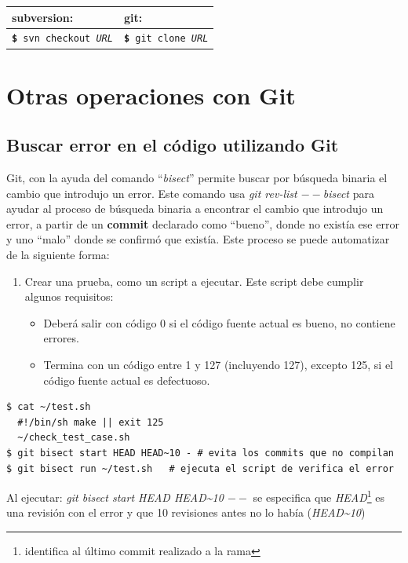 \documentclass[12pt, spanish, oneside, onecolumn, a4paper]{report}
\newcommand{\svngit}[2]{%
  \begin{tabular}{| l | l |} 
    \hline subversion: & git: \\
    \hline 
    \colorbox{mygray}{\texttt{\textbf{\footnotesize\$} #1}} & \colorbox{mygray}{ \texttt{\textbf{\footnotesize\$} #2}} 
  \end{tabular}
}
\begin{document}
% 
\svngit{svn checkout \emph{URL}}{git clone \emph{URL}} 
\chapter{Otras operaciones con Git} 
\label{chap:othergit} 
\section{Buscar error en el código utilizando Git} 
\label{sec:testingwithgit} Git, con la ayuda del comando ``\emph{bisect}'' permite buscar por búsqueda binaria el cambio que introdujo un error. Este comando usa 
\emph{git rev-list $--$bisect} para ayudar al proceso de búsqueda binaria a encontrar el cambio que introdujo un error, a partir de un 
\textbf{commit} declarado como ``bueno'', donde no existía ese error y uno ``malo'' donde se confirmó que existía. Este proceso se puede automatizar de la siguiente forma: 
\begin{enumerate} 
\item Crear una prueba, como un script a ejecutar. Este script debe cumplir algunos requisitos: 
  \begin{itemize} 
  \item Deberá salir con código 0 si el código fuente actual es bueno, no contiene errores.
  \item Termina con un código entre 1 y 127 (incluyendo 127), excepto 125, si el código fuente actual es defectuoso. 
  \end{itemize} 
\end{enumerate} 
\begin{verbatim}
$ cat ~/test.sh 
  #!/bin/sh make || exit 125
  ~/check_test_case.sh
$ git bisect start HEAD HEAD~10 - # evita los commits que no compilan
$ git bisect run ~/test.sh   # ejecuta el script de verifica el error
\end{verbatim}


Al ejecutar: \emph{git bisect start HEAD HEAD\~{}10 $--$} se especifica que \emph {HEAD}\footnote{identifica al último commit realizado a la rama} es una revisión con el error y que 10 revisiones antes no lo había (\emph{HEAD\~{}10})

\glsaddall 
\printglossaries 
\end{document}
